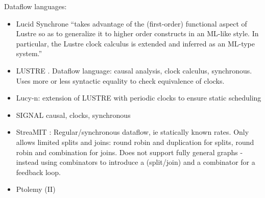 Dataflow languages:
\begin{itemize}
\item Lucid Synchrone
``takes advantage of the (first-order) functional aspect of Lustre so as to generalize it to higher order constructs in an ML-like style. In particular, the Lustre clock calculus is extended and inferred as an ML-type system.'' \cite{benveniste2003synchronous}
\item LUSTRE \cite{halbwachs1991synchronous}.
Dataflow language: causal analysis, clock calculus, synchronous.
Uses more or less syntactic equality to check equivalence of clocks.
\item Lucy-n: extension of LUSTRE with periodic clocks to ensure static scheduling \cite{mandel2010lucy}
\item SIGNAL \cite{le2003polychrony}
causal, clocks, synchronous
\item StreaMIT \cite{thies2002streamit}:
Regular/synchronous dataflow, ie statically known rates.
Only allows limited splits and joins: round robin and duplication for splits, round robin and combination for joins. 
Does not support fully general graphs - instead using combinators to introduce a (split/join) and a combinator for a feedback loop.
\item Ptolemy (II)
\end{itemize}

